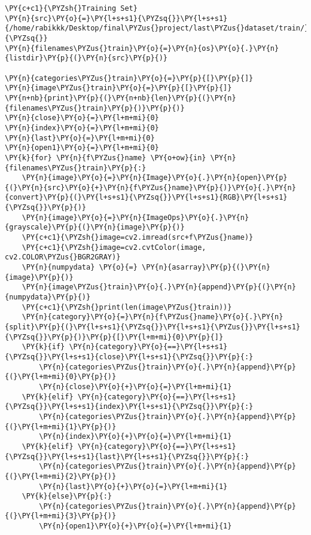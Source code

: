     \begin{tcolorbox}[breakable, size=fbox, boxrule=1pt, pad at break*=1mm,colback=cellbackground, colframe=cellborder]
\begin{Verbatim}[commandchars=\\\{\}]
\PY{c+c1}{\PYZsh{}Training Set}
\PY{n}{src}\PY{o}{=}\PY{l+s+s1}{\PYZsq{}}\PY{l+s+s1}{/home/rabikkk/Desktop/final\PYZus{}project/last\PYZus{}dataset/train/}\PY{l+s+s1}{\PYZsq{}}
\PY{n}{filenames\PYZus{}train}\PY{o}{=}\PY{n}{os}\PY{o}{.}\PY{n}{listdir}\PY{p}{(}\PY{n}{src}\PY{p}{)}

\PY{n}{categories\PYZus{}train}\PY{o}{=}\PY{p}{[}\PY{p}{]}
\PY{n}{image\PYZus{}train}\PY{o}{=}\PY{p}{[}\PY{p}{]}
\PY{n+nb}{print}\PY{p}{(}\PY{n+nb}{len}\PY{p}{(}\PY{n}{filenames\PYZus{}train}\PY{p}{)}\PY{p}{)}
\PY{n}{close}\PY{o}{=}\PY{l+m+mi}{0}
\PY{n}{index}\PY{o}{=}\PY{l+m+mi}{0}
\PY{n}{last}\PY{o}{=}\PY{l+m+mi}{0}
\PY{n}{open1}\PY{o}{=}\PY{l+m+mi}{0}
\PY{k}{for} \PY{n}{f\PYZus{}name} \PY{o+ow}{in} \PY{n}{filenames\PYZus{}train}\PY{p}{:}
    \PY{n}{image}\PY{o}{=}\PY{n}{Image}\PY{o}{.}\PY{n}{open}\PY{p}{(}\PY{n}{src}\PY{o}{+}\PY{n}{f\PYZus{}name}\PY{p}{)}\PY{o}{.}\PY{n}{convert}\PY{p}{(}\PY{l+s+s1}{\PYZsq{}}\PY{l+s+s1}{RGB}\PY{l+s+s1}{\PYZsq{}}\PY{p}{)}
    \PY{n}{image}\PY{o}{=}\PY{n}{ImageOps}\PY{o}{.}\PY{n}{grayscale}\PY{p}{(}\PY{n}{image}\PY{p}{)}
    \PY{c+c1}{\PYZsh{}image=cv2.imread(src+f\PYZus{}name)}
    \PY{c+c1}{\PYZsh{}image=cv2.cvtColor(image, cv2.COLOR\PYZus{}BGR2GRAY)}
    \PY{n}{numpydata} \PY{o}{=} \PY{n}{asarray}\PY{p}{(}\PY{n}{image}\PY{p}{)}
    \PY{n}{image\PYZus{}train}\PY{o}{.}\PY{n}{append}\PY{p}{(}\PY{n}{numpydata}\PY{p}{)}
    \PY{c+c1}{\PYZsh{}print(len(image\PYZus{}train))}
    \PY{n}{category}\PY{o}{=}\PY{n}{f\PYZus{}name}\PY{o}{.}\PY{n}{split}\PY{p}{(}\PY{l+s+s1}{\PYZsq{}}\PY{l+s+s1}{\PYZus{}}\PY{l+s+s1}{\PYZsq{}}\PY{p}{)}\PY{p}{[}\PY{l+m+mi}{0}\PY{p}{]}
    \PY{k}{if} \PY{n}{category}\PY{o}{==}\PY{l+s+s1}{\PYZsq{}}\PY{l+s+s1}{close}\PY{l+s+s1}{\PYZsq{}}\PY{p}{:}
        \PY{n}{categories\PYZus{}train}\PY{o}{.}\PY{n}{append}\PY{p}{(}\PY{l+m+mi}{0}\PY{p}{)}
        \PY{n}{close}\PY{o}{+}\PY{o}{=}\PY{l+m+mi}{1}    
    \PY{k}{elif} \PY{n}{category}\PY{o}{==}\PY{l+s+s1}{\PYZsq{}}\PY{l+s+s1}{index}\PY{l+s+s1}{\PYZsq{}}\PY{p}{:} 
        \PY{n}{categories\PYZus{}train}\PY{o}{.}\PY{n}{append}\PY{p}{(}\PY{l+m+mi}{1}\PY{p}{)}
        \PY{n}{index}\PY{o}{+}\PY{o}{=}\PY{l+m+mi}{1} 
    \PY{k}{elif} \PY{n}{category}\PY{o}{==}\PY{l+s+s1}{\PYZsq{}}\PY{l+s+s1}{last}\PY{l+s+s1}{\PYZsq{}}\PY{p}{:} 
        \PY{n}{categories\PYZus{}train}\PY{o}{.}\PY{n}{append}\PY{p}{(}\PY{l+m+mi}{2}\PY{p}{)}
        \PY{n}{last}\PY{o}{+}\PY{o}{=}\PY{l+m+mi}{1}
    \PY{k}{else}\PY{p}{:}
        \PY{n}{categories\PYZus{}train}\PY{o}{.}\PY{n}{append}\PY{p}{(}\PY{l+m+mi}{3}\PY{p}{)}
        \PY{n}{open1}\PY{o}{+}\PY{o}{=}\PY{l+m+mi}{1}


\end{Verbatim}
\end{tcolorbox}
